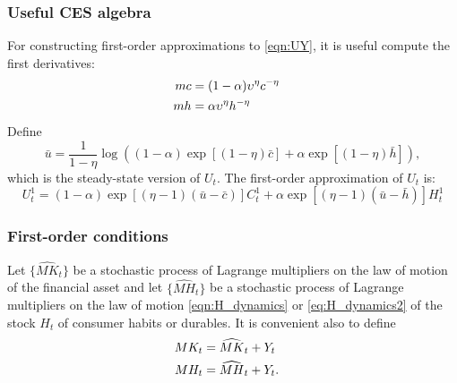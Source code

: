 \documentclass[12pt]{article}
\begin{document}
\subsubsection{Useful CES algebra}
For constructing first-order approximations to \eqref{eqn:UY}, it is useful compute the first derivatives:
\begin{align*}
mc & = (1- \alpha) \upsilon^{\eta } c^{-\eta} \cr
mh & = \alpha \upsilon^{\eta} h^{-\eta}
\end{align*}
Define
\[
{\bar u} = {\frac 1 {1-\eta}} \log \left( (1 - \alpha) \exp[(1-\eta) {\bar c}] + \alpha \exp[(1-\eta){\bar h}] \right),
\]
which is the steady-state version of $U_t$.  The first-order approximation of $U_t$ is:
\begin{equation} \label{firstorderutil}
U_t^1 = (1-\alpha) \exp\left[ (\eta - 1) ({\bar u}  -  {\bar c}) \right] C_t^1 +  \alpha  \exp\left[ (\eta - 1) ({\bar u}  -  {\bar h}) \right] H_t^1
\end{equation}




\subsubsection{First-order conditions}

Let $\{\widehat{MK}_t\}$ be a stochastic process of Lagrange multipliers on the law of motion of the financial asset and
 let $\{\widehat{MH}_t\}$ be a stochastic process of Lagrange multipliers on the law of motion \eqref{eqn:H_dynamics} or \eqref{eq:H_dynamics2}  of the stock 
 $H_t$ of consumer habits or durables.
 It is convenient also to define
\begin{align*}
MK_t & = \widehat{MK}_t + Y_t \cr
MH_t & = \widehat{MH}_t + Y_t . 
\end{align*} 
  
\end{document}
